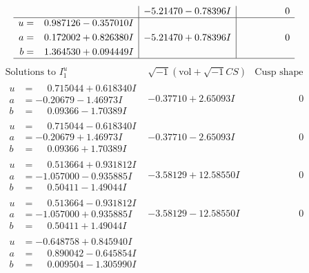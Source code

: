 \documentclass[1p]{elsarticle_modified}
\theoremstyle{definition}
\newcommand{\I}{\sqrt{-1}}
\begin{document}
$$\begin{array}{c|c|c}
 & -5.21470 - 0.78396 I & \phantom{-0.000000 } 0 \\ \hline\begin{aligned}
u &= \phantom{-}0.987126 - 0.357010 I \\
a &= \phantom{-}0.172002 + 0.826380 I \\
b &= \phantom{-}1.364530 + 0.094449 I\end{aligned}
 & -5.21470 + 0.78396 I & \phantom{-0.000000 } 0\\
 \hline 
 \end{array}$$\newpage$$\begin{array}{c|c|c}  
\text{Solutions to }I^u_{1}& \I (\text{vol} + \sqrt{-1}CS) & \text{Cusp shape}\\
 \hline 
\begin{aligned}
u &= \phantom{-}0.715044 + 0.618340 I \\
a &= -0.20679 - 1.46973 I \\
b &= \phantom{-}0.09366 - 1.70389 I\end{aligned}
 & -0.37710 + 2.65093 I & \phantom{-0.000000 } 0 \\ \hline\begin{aligned}
u &= \phantom{-}0.715044 - 0.618340 I \\
a &= -0.20679 + 1.46973 I \\
b &= \phantom{-}0.09366 + 1.70389 I\end{aligned}
 & -0.37710 - 2.65093 I & \phantom{-0.000000 } 0 \\ \hline\begin{aligned}
u &= \phantom{-}0.513664 + 0.931812 I \\
a &= -1.057000 - 0.935885 I \\
b &= \phantom{-}0.50411 - 1.49044 I\end{aligned}
 & -3.58129 + 12.58550 I & \phantom{-0.000000 } 0 \\ \hline\begin{aligned}
u &= \phantom{-}0.513664 - 0.931812 I \\
a &= -1.057000 + 0.935885 I \\
b &= \phantom{-}0.50411 + 1.49044 I\end{aligned}
 & -3.58129 - 12.58550 I & \phantom{-0.000000 } 0 \\ \hline\begin{aligned}
u &= -0.648758 + 0.845940 I \\
a &= \phantom{-}0.890042 - 0.645854 I \\
b &= \phantom{-}0.009504 - 1.305990 I\end{aligned}

\end{array}$$
\end{document}
